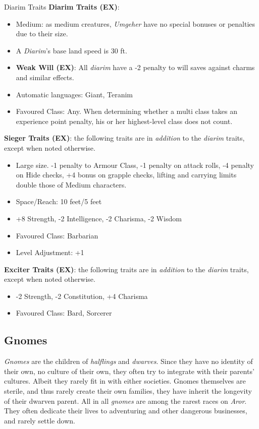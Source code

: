 \begin{35e}{Diarim Traits}
  \textbf{Diarim Traits (EX)}:
  \begin{itemize}[noitemsep]
    \item Medium: as medium creatures, \emph{Umgeher} have no special bonuses or
    penalties due to their size.
    \item A \emph{Diarim}'s base land speed is 30 ft.
    \item \textbf{Weak Will (EX)}: All \emph{diarim} have a -2 penalty to will
    saves against charms and similar effects.
    \item Automatic languages: Giant, Teranim
    \item Favoured Class: Any. When determining whether a multi class takes an
    experience point penalty, his or her highest-level class does not count.
  \end{itemize}

  \textbf{Sieger Traits (EX)}: the following traits are in \emph{addition} to
  the \emph{diarim} traits, except when noted otherwise.
  \begin{itemize}[noitemsep]
    \item Large size. -1 penalty to Armour Class, -1 penalty on attack rolls,
    -4 penalty on Hide checks, +4 bonus on grapple checks, lifting and
    carrying limits double those of Medium characters.
    \item Space/Reach: 10 feet/5 feet
    \item +8 Strength, -2 Intelligence, -2 Charisma, -2 Wisdom
    \item Favoured Class: Barbarian
    \item Level Adjustment: +1
  \end{itemize}

  \textbf{Exciter Traits (EX)}: the following traits are in \emph{addition} to
  the \emph{diarim} traits, except when noted otherwise.
  \begin{itemize}[noitemsep]
    \item -2 Strength, -2 Constitution, +4 Charisma
    \item Favoured Class: Bard, Sorcerer
  \end{itemize}
\end{35e}

\subsection{Gnomes}
\label{sec:Gnomes}

\emph{Gnomes} are the children of \emph{halflings} and \emph{dwarves}. Since
they have no identity of their own, no culture of their own, they often try to
integrate with their parents' cultures. Albeit they rarely fit in with either
societies. Gnomes themselves are sterile, and thus rarely create their own
families, they have inherit the longevity of their dwarven parent. All in
all \emph{gnomes} are among the rarest races on \emph{Aror}. They often
dedicate their lives to adventuring and other dangerous businesses, and rarely
settle down.

